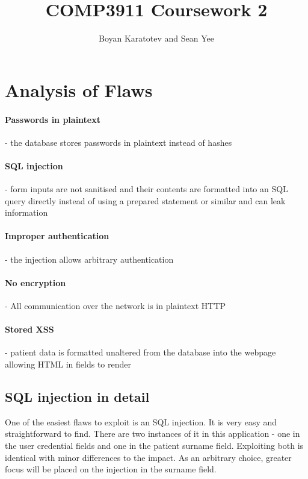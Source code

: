 \documentclass[10pt]{article}
\title{COMP3911 Coursework 2}
\author{Boyan Karatotev and Sean Yee}
\date{}
\begin{document}
    \maketitle

    \section{Analysis of Flaws}

        \paragraph{Passwords in plaintext} - the database stores passwords in
        plaintext instead of hashes

        \paragraph{SQL injection} - form inputs are not sanitised and their
        contents are formatted into an SQL query directly instead of using a
        prepared statement or similar and can leak information

        \paragraph{Improper authentication} - the injection allows arbitrary
        authentication

        \paragraph{No encryption} - All communication over the network is in
        plaintext HTTP

        \paragraph{Stored XSS} - patient data is formatted unaltered from the
        database into the webpage allowing HTML in fields to render

        \subsection{SQL injection in detail}

            One of the easiest flaws to exploit is an SQL injection. It is very
            easy and straightforward to find. There are two instances of it in
            this application - one in the user credential fields and one in the
            patient surname field. Exploiting both is identical with minor
            differences to the impact. As an arbitrary choice, greater focus
            will be placed on the injection in the surname field.
\end{document}
